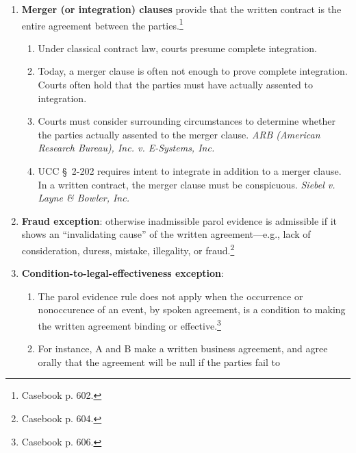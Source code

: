 \begin{enumerate}
{    Industries, Inc. v. Doliner}.
    \begin{enumerate}
        \item The \emph{Hunt Foods} view of consistency is too narrow. A 
        better definition is ``the absence of reasonable harmony in terms of 
        the language and respective obligations of the 
        parties.''\footnote{Casebook p. 601.} \emph{Alaska Northern 
        Development, Inc. v. Alyeska Pipeline Service Co.}
    \end{enumerate}
    \item \textbf{Merger (or integration) clauses} provide that the written 
    contract is the entire agreement between the parties.\footnote{Casebook p. 
    602.}
    \begin{enumerate}
        \item Under classical contract law, courts presume complete 
        integration.
        \item Today, a merger clause is often not enough to prove complete 
        integration. Courts often hold that the parties must have actually 
        assented to integration.
        \item Courts must consider surrounding circumstances to determine 
        whether the parties actually assented to the merger clause. \emph{ARB 
        (American Research Bureau), Inc. v. E-Systems, Inc.}
        \item UCC \S\ 2-202 requires intent to integrate in addition to a 
        merger clause. In a written contract, the merger clause must be 
        conspicuous. \emph{Siebel v. Layne \& Bowler, Inc.}
    \end{enumerate}
    \item \textbf{Fraud exception}: otherwise inadmissible parol evidence is 
    admissible if it shows an ``invalidating cause'' of the written 
    agreement---e.g., lack of consideration, duress, mistake, illegality, or 
    fraud.\footnote{Casebook p. 604.}
    \item \textbf{Condition-to-legal-effectiveness exception}: 
    \begin{enumerate}
        \item The parol evidence rule does not apply when the occurrence or 
        nonoccurence of an event, by spoken agreement, is a condition to 
        making the written agreement binding or effective.\footnote{Casebook 
        p. 606.}
        \item For instance, A and B make a written business agreement, and 
        agree orally that the agreement will be null if the parties fail to 

\end{enumerate}
\end{enumerate}
